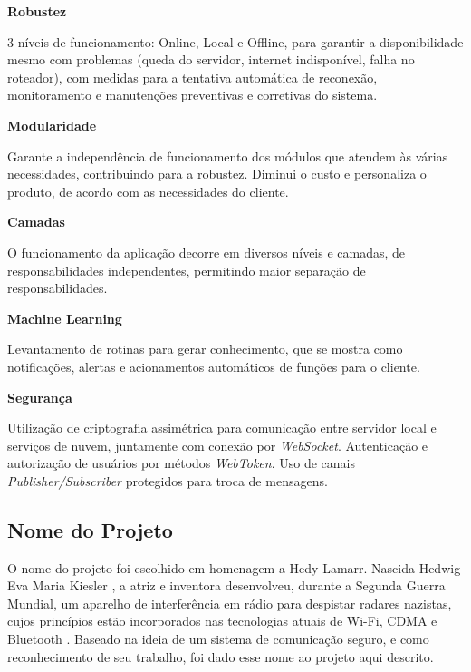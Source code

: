 \begin{description}
\item \textbf{Robustez}

3 níveis de funcionamento: Online, Local e Offline, para garantir a disponibilidade mesmo com problemas (queda do servidor, internet indisponível, falha no roteador), com medidas para a tentativa automática de reconexão, monitoramento e manutenções preventivas e corretivas do sistema.

\item \textbf{Modularidade}

Garante a independência de funcionamento dos módulos que atendem às várias necessidades, contribuindo para a robustez. Diminui o custo e personaliza o produto, de acordo com as necessidades do cliente.

\item \textbf{Camadas}

O funcionamento da aplicação decorre em diversos níveis e camadas, de responsabilidades independentes, permitindo maior separação de responsabilidades.

\item \textbf{Machine Learning}

Levantamento de rotinas para gerar conhecimento, que se mostra como notificações, alertas e acionamentos automáticos de funções para o cliente.

\item \textbf{Segurança}

Utilização de criptografia assimétrica para comunicação entre servidor local e serviços de nuvem, juntamente com conexão por \textit{WebSocket}. Autenticação e autorização de usuários por métodos \textit{WebToken}. Uso de canais \textit{Publisher/Subscriber} protegidos para troca de mensagens.

\end{description}

\subsection{Nome do Projeto}
O nome do projeto foi escolhido em homenagem a Hedy Lamarr. Nascida Hedwig Eva Maria Kiesler \cite{shearer}, a atriz e inventora desenvolveu, durante a Segunda Guerra Mundial, um aparelho de interferência em rádio para despistar radares nazistas, cujos princípios estão incorporados nas tecnologias atuais de Wi-Fi, CDMA e Bluetooth \cite{electronicFrontier}. Baseado na ideia de um sistema de comunicação seguro, e como reconhecimento de seu trabalho, foi dado esse nome ao projeto aqui descrito.

